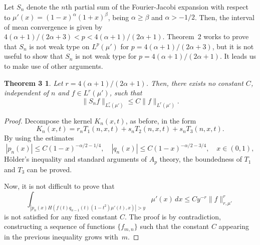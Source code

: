 \documentclass[11pt,a4paper]{article}
\theoremstyle{plain}
\newtheorem*{theoThree}{Theorem 3}
\theoremstyle{definition}
\theoremstyle{remark}
\begin{document}
Let $S_{n}$ denote the $n$th partial sum of the Fourier-Jacobi expansion 
with respect to $\mu'(x) = (1-x)^{\alpha}(1+x)^{\beta}$, 
being $\alpha \geq \beta$ and $\alpha > -1/2$. 
Then, the interval of mean convergence is given by $4(\alpha+1)/(2\alpha+3) 
< p < 4(\alpha+1)/(2\alpha+1)$. Theorem~2 works 
to prove that $S_{n}$ is not weak type on $L^{p}(\mu')$ for $p 
= 4(\alpha+1)/(2\alpha+3)$, but it is not useful to show 
that $S_{n}$ is not weak type for $p = 4(\alpha+1)/(2\alpha+1)$. 
It leads us to make use of other arguments.

\begin{theoThree}
Let $r = 4(\alpha+1)/(2\alpha+1)$. Then, there exists no 
constant $C$, independent of $n$ and $f \in L^{r}(\mu')$, such that
$$
\|S_{n}f\|_{L^{r}_{*}(\mu')} \leq C\|f\|_{L^{r}(\mu')}.
$$
\end{theoThree}

\begin{proof}
Decompose the kernel $K_{n}(x,t)$, as before, in the 
form
$$
K_{n}(x,t) = r_{n}T_{1}(n,x,t) + s_{n}T_{2}(n,x,t) + 
s_{n}T_{3}(n,x,t).
$$
By using the estimates
$$
|p_{n}(x)| \leq C(1-x)^{-\alpha/2-1/4}, 
\quad
|q_{n}(x)| \leq C(1-x)^{-\alpha/2-3/4}, 
\quad x \in (0,1),
$$
H\"{o}lder's inequality and standard arguments of $A_{p}$ theory, 
the boundedness of $T_{1}$ and $T_{3}$ can be proved.

Now, it is not difficult to prove that
$$
\int_{|p_{n}(x)H(f(t)q_{n-1}(t)(1-t^{2})\mu'(t),x)|>y} \mu'(x)\,dx
\leq Cy^{-r} \|f\|^{r}_{r,\mu'}
$$
is not satisfied for any fixed constant $C$. The proof is by contradiction, 
constructing a sequence of functions $\{f_{m,n}\}$ such that the 
constant $C$ appearing in the previous inequality grows with~$m$.
\end{proof}
\end{document}
